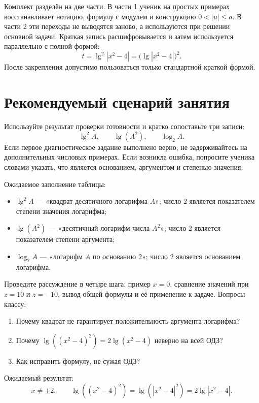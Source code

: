 \begin{teacherbox}
  Комплект разделён на две части. В части 1 ученик на простых примерах
  восстанавливает нотацию, формулу с модулем и конструкцию
  \(0<|u|\le a\). В части 2 эти переходы не выводятся заново, а
  используются при решении основной задачи. Краткая запись расшифровывается
  и затем используется параллельно с полной формой:
  \[
    t=\lg^2|x^2-4|=\bigl(\lg|x^2-4|\bigr)^2.
  \]
  После закрепления допустимо пользоваться только стандартной краткой формой.
\end{teacherbox}

\notationtrianglefigure
\logchainteacherfigure

\section{Рекомендуемый сценарий занятия}

\begin{teacherbox}
  Используйте результат проверки готовности и кратко сопоставьте три записи:
  \[
    \lg^2 A,
    \qquad
    \lg(A^2),
    \qquad
    \log_2 A.
  \]
  Если первое диагностическое задание выполнено верно, не задерживайтесь на
  дополнительных числовых примерах. Если возникла ошибка, попросите ученика
  словами указать, что является основанием, аргументом и степенью значения.

  Ожидаемое заполнение таблицы:
  \begin{itemize}[itemsep=0.2em,topsep=0.25em]
    \item \(\lg^2 A\) --- «квадрат десятичного логарифма \(A\)»;
      число \(2\) является показателем степени значения логарифма;
    \item \(\lg(A^2)\) --- «десятичный логарифм числа \(A^2\)»;
      число \(2\) является показателем степени аргумента;
    \item \(\log_2 A\) --- «логарифм \(A\) по основанию \(2\)»;
      число \(2\) является основанием логарифма.
  \end{itemize}
\end{teacherbox}

\begin{teacherbox}
  Проведите рассуждение в четыре шага: пример \(x=0\), сравнение значений
  при \(z=10\) и \(z=-10\), вывод общей формулы и её применение к задаче.
  Вопросы классу:
  \begin{enumerate}
    \item Почему квадрат не гарантирует положительность аргумента логарифма?
    \item Почему \(\lg((x^2-4)^2)=2\lg(x^2-4)\) неверно на всей ОДЗ?
    \item Как исправить формулу, не сужая ОДЗ?
  \end{enumerate}
  Ожидаемый результат:
  \[
    x\ne\pm2,
    \qquad
    \lg((x^2-4)^2)
      =\lg(|x^2-4|^2)
      =2\lg|x^2-4|.
  \]
\end{teacherbox}


